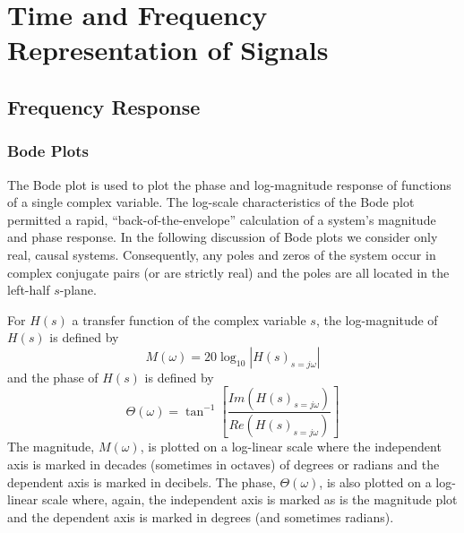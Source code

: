 \chapter[Representation of Signals]{Time and Frequency Representation of Signals}

\section{Frequency Response}
\subsection{Bode Plots}
\label{bode}

	The Bode plot is used to plot the phase
and log-magnitude response of functions of a single
complex variable. The log-scale characteristics
of the Bode plot permitted a rapid, ``back-of-the-envelope''
calculation of a system's magnitude and
phase response.  In the  following discussion of Bode plots
we consider only real, causal systems.
Consequently, any poles and zeros of the system occur
in complex conjugate pairs (or are strictly real) and
the poles are all located in the left-half $s$-plane.

	For $H(s)$ a transfer function 
of the complex variable $s$, the 
log-magnitude of $H(s)$ is defined by
%
\begin{equation}
M(\omega)=20\log_{10}|H(s)_{s=j\omega}|
\label{e.bode1}
\end{equation}
%
and the phase of $H(s)$ is defined by
%
\begin{equation}
\Theta(\omega)=\tan^{-1}[\frac{Im(H(s)_{s=j\omega})}{Re(H(s)_{s=j\omega})}]
\label{e.bode2}
\end{equation}
%
The magnitude, $M(\omega)$, is plotted on a log-linear scale
where the independent axis is marked in decades (sometimes
in octaves) of degrees or radians and the dependent axis is marked
in decibels.  The phase, $\Theta(\omega)$, is also plotted on a log-linear
scale where, again, the independent axis is marked as is the magnitude plot
and the dependent axis is marked in degrees (and sometimes radians).


